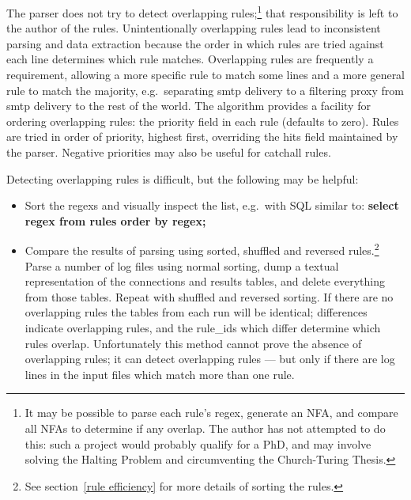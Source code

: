 \documentclass[a4paper,12pt,draft]{article}
\begin{document}
The parser does not try to detect overlapping rules;\footnote{It may be
possible to parse each rule's regex, generate an NFA, and compare all NFAs
to determine if any overlap.  The author has not attempted to do this: such
a project would probably qualify for a PhD, and may involve solving the
Halting Problem and circumventing the Church-Turing Thesis.} that
responsibility is left to the author of the rules.  Unintentionally
overlapping rules lead to inconsistent parsing and data extraction because
the order in which rules are tried against each line determines which rule
matches.  Overlapping rules are frequently a requirement, allowing a more
specific rule to match some lines and a more general rule to match the
majority, e.g.\ separating smtp delivery to a filtering proxy from smtp
delivery to the rest of the world.  The algorithm provides a facility for
ordering overlapping rules: the priority field in each rule (defaults to
zero).  Rules are tried in order of priority, highest first, overriding the
hits field maintained by the parser.  Negative priorities may also be
useful for catchall rules.

Detecting overlapping rules is difficult, but the following may be helpful:

\begin{itemize}

    \item Sort the regexs and visually inspect the list, e.g.\ with SQL
        similar to: \textbf{select regex from rules order by regex;}

    \item Compare the results of parsing using sorted, shuffled and
        reversed rules.\footnote{See section~\ref{rule efficiency} for more
        details of sorting the rules.}  Parse a number of log files using
        normal sorting, dump a textual representation of the connections
        and results tables, and delete everything from those tables.
        Repeat with shuffled and reversed sorting.  If there are no
        overlapping rules the tables from each run will be identical;
        differences indicate overlapping rules, and the rule\_ids which
        differ determine which rules overlap.  Unfortunately this method
        cannot prove the absence of overlapping rules; it can detect
        overlapping rules --- but only if there are log lines in the input
        files which match more than one rule.

\end{itemize}
\end{document}
